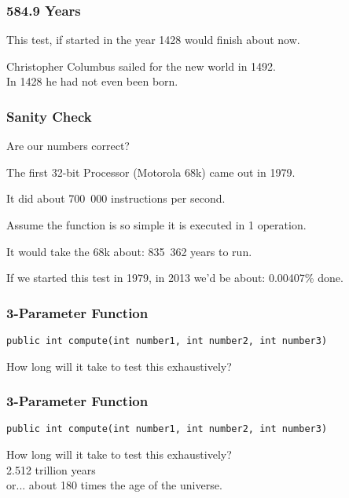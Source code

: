 \begin{frame}
\frametitle{584.9 Years}
\begin{changemargin}{1cm}

This test, if started in the year 1428 would finish about now.

Christopher Columbus sailed for the new world in 1492.\\
\quad In 1428 he had not even been born.

\end{changemargin}
\end{frame}

\begin{frame}
\frametitle{Sanity Check}
\begin{changemargin}{1cm}
Are our numbers correct? 

The first 32-bit Processor (Motorola 68k) came out in 1979.

It did about 700~000 instructions per second. 

Assume the function is so simple it is executed in 1 operation.

It would take the 68k about: \alert{835~362} years to run. 

If we started this test in 1979, in 2013 we'd be about: \alert{0.00407\%} done.

\end{changemargin}
\end{frame}

\begin{frame}
\frametitle{3-Parameter Function}
\begin{changemargin}{1cm}

\texttt{public int compute(int number1, int number2, int number3)}

How long will it take to test this exhaustively?

\end{changemargin}
\end{frame}

\begin{frame}
\frametitle{3-Parameter Function}
\begin{changemargin}{1cm}

\texttt{public int compute(int number1, int number2, int number3)}

How long will it take to test this exhaustively? \\\alert{2.512 trillion years}\\
or... about 180 times the age of the universe.

\end{changemargin}
\end{frame}

